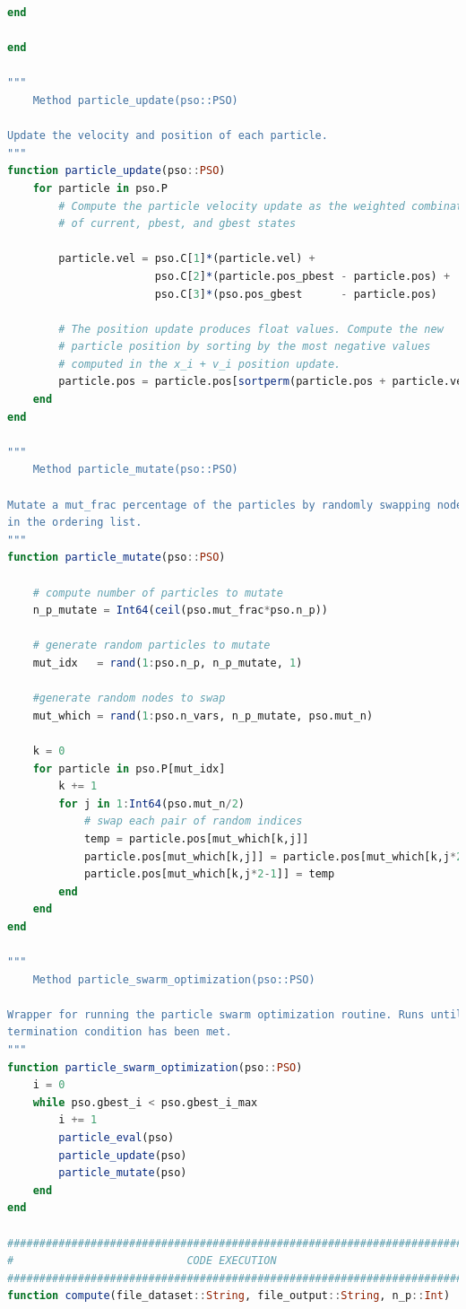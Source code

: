 \documentclass[twoside,11pt]{article}
\begin{document}
\begin{algorithm}
\begin{lstlisting}[language=Julia]
    end

end

"""
    Method particle_update(pso::PSO)

Update the velocity and position of each particle.
"""
function particle_update(pso::PSO)
    for particle in pso.P
        # Compute the particle velocity update as the weighted combination
        # of current, pbest, and gbest states

        particle.vel = pso.C[1]*(particle.vel) +
                       pso.C[2]*(particle.pos_pbest - particle.pos) +
                       pso.C[3]*(pso.pos_gbest      - particle.pos) 

        # The position update produces float values. Compute the new
        # particle position by sorting by the most negative values 
        # computed in the x_i + v_i position update.
        particle.pos = particle.pos[sortperm(particle.pos + particle.vel)]
    end
end

"""
    Method particle_mutate(pso::PSO)

Mutate a mut_frac percentage of the particles by randomly swapping nodes
in the ordering list.
"""
function particle_mutate(pso::PSO)

    # compute number of particles to mutate
    n_p_mutate = Int64(ceil(pso.mut_frac*pso.n_p))

    # generate random particles to mutate
    mut_idx   = rand(1:pso.n_p, n_p_mutate, 1)

    #generate random nodes to swap
    mut_which = rand(1:pso.n_vars, n_p_mutate, pso.mut_n)

    k = 0
    for particle in pso.P[mut_idx]
        k += 1
        for j in 1:Int64(pso.mut_n/2)
            # swap each pair of random indices
            temp = particle.pos[mut_which[k,j]]
            particle.pos[mut_which[k,j]] = particle.pos[mut_which[k,j*2-1]]
            particle.pos[mut_which[k,j*2-1]] = temp
        end
    end
end

"""
    Method particle_swarm_optimization(pso::PSO)

Wrapper for running the particle swarm optimization routine. Runs until
termination condition has been met.
"""
function particle_swarm_optimization(pso::PSO)
    i = 0
    while pso.gbest_i < pso.gbest_i_max
        i += 1
        particle_eval(pso)
        particle_update(pso)
        particle_mutate(pso)
    end
end

########################################################################
#                           CODE EXECUTION                             #
########################################################################
function compute(file_dataset::String, file_output::String, n_p::Int)


\end{lstlisting}
\end{algorithm}
\end{document}
